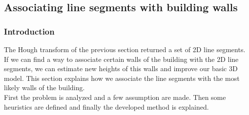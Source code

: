 \documentclass[10pt]{article}
\begin{document}
{\subsection{Associating line segments with building walls}
%
% 
% 

	\subsubsection{Introduction}
	The Hough transform of the previous section returned a set of 2D line
	segments.  If we can find a way to associate certain walls of the building with
	the 2D line segments, we can estimate new heights of this walls and improve our basic 3D model.
	This section explains how we associate the line segments with the most
	likely walls of the building. \\
	First the problem is analyzed and a few assumption are made.  Then some
	heuristics are defined and finally the developed method is explained.
}
\end{document}
